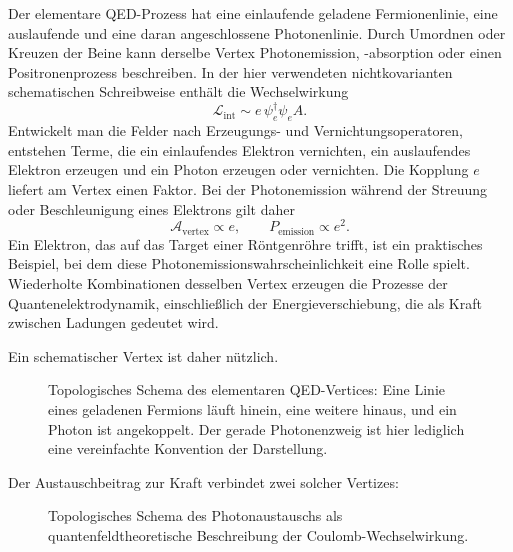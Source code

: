 Der elementare QED-Prozess hat eine einlaufende geladene Fermionenlinie, eine auslaufende und eine daran angeschlossene Photonenlinie. Durch Umordnen oder Kreuzen der Beine kann derselbe Vertex Photonemission, -absorption oder einen Positronenprozess beschreiben. In der hier verwendeten nichtkovarianten schematischen Schreibweise enthält die Wechselwirkung
\begin{equation}
\mathcal{L}_{\mathrm{int}}\sim e\,\psi_e^\dagger \psi_e A.
\end{equation}
Entwickelt man die Felder nach Erzeugungs- und Vernichtungsoperatoren, entstehen Terme, die ein einlaufendes Elektron vernichten, ein auslaufendes Elektron erzeugen und ein Photon erzeugen oder vernichten. Die Kopplung \(e\) liefert am Vertex einen Faktor. Bei der Photonemission während der Streuung oder Beschleunigung eines Elektrons gilt daher
\begin{equation}
\mathcal{A}_{\mathrm{vertex}}\propto e,
\qquad
P_{\mathrm{emission}}\propto e^2.
\end{equation}
Ein Elektron, das auf das Target einer Röntgenröhre trifft, ist ein praktisches Beispiel, bei dem diese Photonemissionswahrscheinlichkeit eine Rolle spielt. Wiederholte Kombinationen desselben Vertex erzeugen die Prozesse der Quantenelektrodynamik, einschließlich der Energieverschiebung, die als Kraft zwischen Ladungen gedeutet wird.

Ein schematischer Vertex ist daher nützlich.

\begin{figure}[h]
\centering
{}
\caption{Topologisches Schema des elementaren QED-Vertices: Eine Linie eines geladenen Fermions läuft hinein, eine weitere hinaus, und ein Photon ist angekoppelt. Der gerade Photonenzweig ist hier lediglich eine vereinfachte Konvention der Darstellung.}
\end{figure}

Der Austauschbeitrag zur Kraft verbindet zwei solcher Vertizes:

\begin{figure}[h]
\centering
{}
\caption{Topologisches Schema des Photonaustauschs als quantenfeldtheoretische Beschreibung der Coulomb-Wechselwirkung.}
\end{figure}

